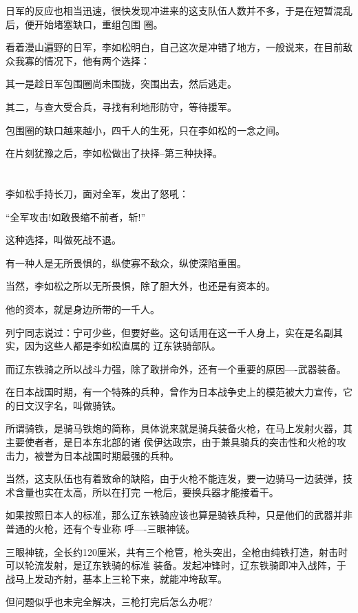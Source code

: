 \documentclass[11pt,a4paper,onecolumn]{article}
\begin{document}
日军的反应也相当迅速，很快发现冲进来的这支队伍人数并不多，于是在短暂混乱后，便开始堵塞缺口，重组包围
圈。

看着漫山遍野的日军，李如松明白，自己这次是冲错了地方，一般说来，在目前敌众我寡的情况下，他有两个选择：

其一是趁日军包围圈尚未围拢，突围出去，然后逃走。

其二，与查大受合兵，寻找有利地形防守，等待援军。

包围圈的缺口越来越小，四千人的生死，只在李如松的一念之间。

在片刻犹豫之后，李如松做出了抉择--第三种抉择。

\section[\thesection]{}

李如松手持长刀，面对全军，发出了怒吼：

``全军攻击!如敢畏缩不前者，斩!''

这种选择，叫做死战不退。

有一种人是无所畏惧的，纵使寡不敌众，纵使深陷重围。

当然，李如松之所以无所畏惧，除了胆大外，也还是有资本的。

他的资本，就是身边所带的一千人。

列宁同志说过：宁可少些，但要好些。这句话用在这一千人身上，实在是名副其实，因为这些人都是李如松直属的
辽东铁骑部队。

而辽东铁骑之所以战斗力强，除了敢拼命外，还有一个重要的原因----武器装备。

在日本战国时期，有一个特殊的兵种，曾作为日本战争史上的模范被大力宣传，它的日文汉字名，叫做骑铁。

所谓骑铁，是骑马铁炮的简称，具体说来就是骑兵装备火枪，在马上发射火器，其主要使者者，是日本东北部的诸
侯伊达政宗，由于兼具骑兵的突击性和火枪的攻击力，被誉为日本战国时期最强的兵种。

当然，这支队伍也有着致命的缺陷，由于火枪不能连发，要一边骑马一边装弹，技术含量也实在太高，所以在打完
一枪后，要换兵器才能接着干。

如果按照日本人的标准，那么辽东铁骑应该也算是骑铁兵种，只是他们的武器并非普通的火枪，还有个专业称
呼----三眼神铳。

三眼神铳，全长约120厘米，共有三个枪管，枪头突出，全枪由纯铁打造，射击时可以轮流发射，是辽东铁骑的标准
装备。发起冲锋时，辽东铁骑即冲入战阵，于战马上发动齐射，基本上三轮下来，就能冲垮敌军。

但问题似乎也未完全解决，三枪打完后怎么办呢?
\end{document}
